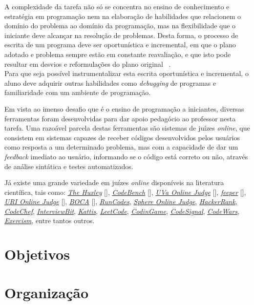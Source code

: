A complexidade da tarefa não só se concentra no ensino de conhecimento e 
estratégia em programação nem na elaboração de habilidades que relacionem o domínio 
do problema ao domínio da programação, mas na flexibilidade que o iniciante deve 
alcançar na resolução de problemas. Desta forma, o processo de escrita 
de um programa deve  ser oportunística e incremental, em que o plano adotado 
e problema sempre estão em 
constante reavaliação, e que isto pode resultar em desvios e reformulações do plano
original \ \cite{visser1990more}. \\
Para que seja possível instrumentalizar esta escrita oportunística e incremental, 
o aluno deve adquirir outras habilidades como \emph{debugging} de programas e 
familiaridade com um ambiente de programação.

Em vista ao imenso desafio que é o ensino de programação a iniciantes, diversas ferramentas 
foram desenvolvidas para dar apoio pedagócio ao professor nesta tarefa. Uma razoável parcela 
destas ferramentas são sistemas de juízes \emph{online}, que consistem em sistemas capazes 
de receber códigos desenvolvidos pelos usuários como resposta a um determinado problema, mas 
com a capacidade de dar um \emph{feedback} imediato ao usuário, informando 
se o código está correto ou não, através de análise sintática e testes automatizados.

Já existe uma grande variedade em juízes \emph{online} disponíveis na literatura científica,
tais como: 
\hyperref[link:the_huxley]{\emph{The Huxley}} [], 
	\hyperref[link:code_bench]{\emph{CodeBench}} [],  
	\hyperref[link:uva_judge]{\emph{UVa Online Judge}} [], 
	\hyperref[link:feeper]{\emph{feeper}} [], 
	\hyperref[link:uri_judge]{\emph{URI Online Judge}} [], 
	\hyperref[link:boca]{\emph{BOCA}} [],
	\hyperref[link:we_run_codes]{\emph{RunCodes}},
	\hyperref[link:sphere_judge]{\emph{Sphere Online Judge}},
	\hyperref[link:hacker_rank]{\emph{HackerRank}}, 
	\hyperref[link:code_chef]{\emph{CodeChef}}, 
	\hyperref[link:interview_bit]{\emph{InterviewBit}}, 
	\hyperref[link:kattis]{\emph{Kattis}}, 
	\hyperref[link:leet_code]{\emph{LeetCode}}, 
	\hyperref[link:codin_game]{\emph{CodinGame}}, 
	\hyperref[link:code_signal]{\emph{CodeSignal}}, 
	\hyperref[link:code_wars]{\emph{CodeWars}}, 
	\hyperref[link:exercism]{\emph{Exercism}}, 
	entre tantos outros.
	


\section{Objetivos}

\section{Organização}



